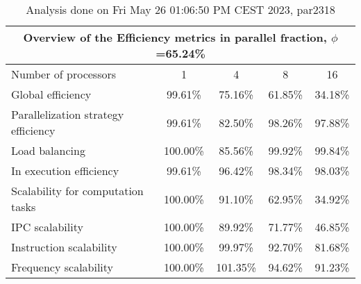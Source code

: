 \begin{table}[h]
\begin{center}
\begin{tabular}{|l|c|c|c|c|}
\hline
\multicolumn{5}{|c|}{Overview of the Efficiency metrics in parallel fraction, $\phi$=65.24\%} \\
\hline
\hline
Number of processors & 1 & 4 & 8 & 16 \\
\hline
\hline
Global efficiency                      &     99.61\% &     75.16\% &     61.85\% &     34.18\% \\
\hline
\hline
Parallelization strategy efficiency &     99.61\% &     82.50\% &     98.26\% &     97.88\% \\
\hline
Load balancing                   &    100.00\% &     85.56\% &     99.92\% &     99.84\% \\
In execution efficiency          &     99.61\% &     96.42\% &     98.34\% &     98.03\% \\
\hline
\hline
Scalability for computation tasks   &    100.00\% &     91.10\% &     62.95\% &     34.92\% \\
\hline
IPC scalability                  &    100.00\% &     89.92\% &     71.77\% &     46.85\% \\
Instruction scalability          &    100.00\% &     99.97\% &     92.70\% &     81.68\% \\
Frequency scalability            &    100.00\% &    101.35\% &     94.62\% &     91.23\% \\
\hline
\end{tabular}
\end{center}
\caption{ Analysis done on Fri May 26 01:06:50 PM CEST 2023, par2318}
\end{table}
